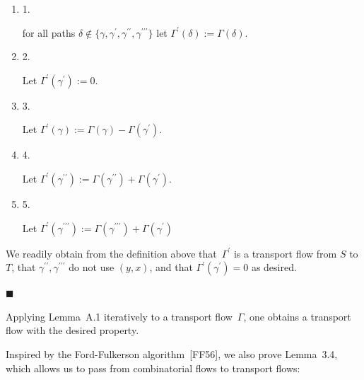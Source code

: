 \begin{enumerate}


\item[] 1. 


for all paths $\delta\notin\{\gamma,\gamma^{\prime},\gamma^{\prime\prime},\gamma^{\prime\prime\prime}\}$ let $\Gamma^{\prime}(\delta):=\Gamma(\delta)$.\par




\item[] 2. 


Let $\Gamma^{\prime}(\gamma^{\prime}):=0$.\par




\item[] 3. 


Let $\Gamma^{\prime}(\gamma):=\Gamma(\gamma)-\Gamma(\gamma^{\prime})$.\par




\item[] 4. 


Let $\Gamma^{\prime}(\gamma^{\prime\prime}):=\Gamma(\gamma^{\prime\prime})+\Gamma(\gamma^{\prime})$.\par




\item[] 5. 


Let $\Gamma^{\prime}(\gamma^{\prime\prime\prime}):=\Gamma(\gamma^{\prime\prime\prime})+\Gamma(\gamma^{\prime})$\par




\end{enumerate}


We readily obtain from the definition above that $\Gamma^{\prime}$ is a transport flow from $S$ to $T$, that $\gamma^{\prime\prime},\gamma^{\prime\prime\prime}$ do not use $(y,x)$, and that $\Gamma^{\prime}(\gamma^{\prime})=0$ as desired.\par




\ensuremath{\blacksquare}\par





Applying Lemma A.1 iteratively to a transport flow $\Gamma$, one obtains a transport flow with the desired property.\par




Inspired by the Ford-Fulkerson algorithm [FF56], we also prove Lemma 3.4, which allows us to pass from combinatorial flows to transport flows:\par





